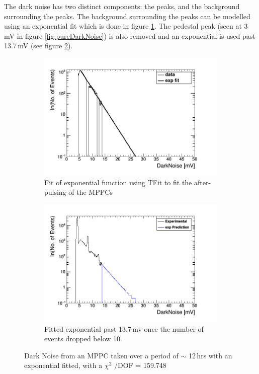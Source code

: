 The dark noise has two distinct components: the peaks, and the background surrounding the peaks. The background surrounding the peaks can be modelled using an exponential fit which is done in figure \ref{subFig:expFitOfDark}. The pedestal peak (seen at 3\,mV in figure \ref{fig:pureDarkNoise}) is also removed and an exponential is used past 13.7\,mV (see figure \ref{subFig:fittedDarkNoise}). 
\begin{figure}[htbp]
\centering
\begin{subfigure}{.5\textwidth}
  \centering
  \includegraphics[width=\linewidth]{fit_of_dark_noise.png}
  \captionsetup{width=.9\linewidth}
  \caption{Fit of exponential function using TFit to fit the after-pulsing of the MPPCs}
  \label{subFig:expFitOfDark}
\end{subfigure}%
\begin{subfigure}{.5\textwidth}
  \centering
  \includegraphics[width=\linewidth]{fittedDarkNoise_output.png}
  \captionsetup{width=.9\linewidth}
  \caption{Fitted exponential past 13.7\,mv once the number of events dropped below 10.}
  \label{subFig:fittedDarkNoise}
\end{subfigure}
\caption{Dark Noise from an MPPC taken over a period of $\sim$ 12\,hrs with an exponential fitted, with a $\chi ^2$ /DOF = 159.748}
\label{fig:fitting_of_non_peak_dark_noise}
\end{figure}

